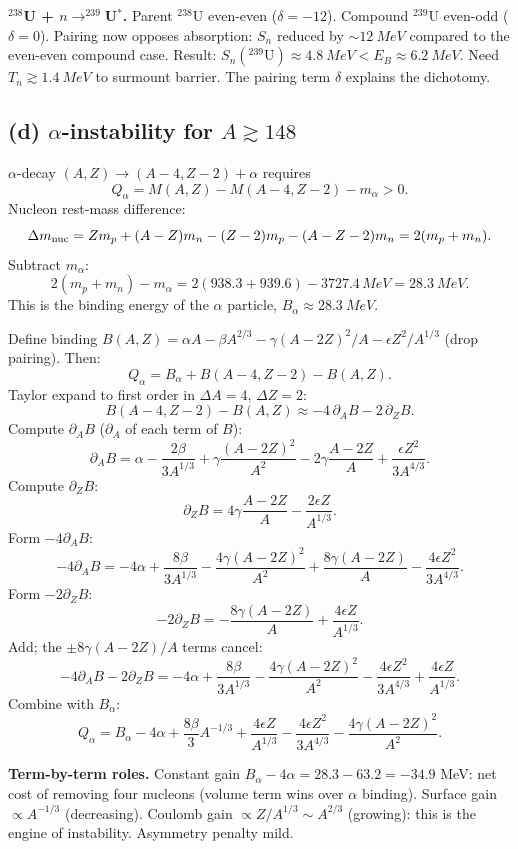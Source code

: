 \documentclass[11pt]{article}
\begin{document}
\textbf{$^{238}$U + $n\to ^{239}$U$^{*}$.} Parent $^{238}$U even-even ($\delta=-12$). Compound $^{239}$U even-odd ($\delta=0$). Pairing now opposes absorption: $S_n$ reduced by $\sim\SI{12}{MeV}$ compared to the even-even compound case. Result: $S_n(^{239}\mathrm{U})\approx \SI{4.8}{MeV}<E_B\approx \SI{6.2}{MeV}$. Need $T_n\gtrsim \SI{1.4}{MeV}$ to surmount barrier. The pairing term $\delta$ explains the dichotomy.

\subsection*{(d) $\alpha$-instability for $A\gtrsim 148$}

$\alpha$-decay $(A,Z)\to(A-4,Z-2)+\alpha$ requires
\[
Q_\alpha=M(A,Z)-M(A-4,Z-2)-m_\alpha>0.
\]
Nucleon rest-mass difference:
\[
\Delta m_{\rm nuc}=Zm_p+(A-Z)m_n-(Z-2)m_p-(A-Z-2)m_n=2(m_p+m_n).
\]
Subtract $m_\alpha$:
\[
2(m_p+m_n)-m_\alpha=2(938.3+939.6)-3727.4\,\si{MeV}=\SI{28.3}{MeV}.
\]
This is the binding energy of the $\alpha$ particle, $B_\alpha\approx\SI{28.3}{MeV}$.

Define binding $B(A,Z)=\alpha A-\beta A^{2/3}-\gamma(A-2Z)^{2}/A-\epsilon Z^{2}/A^{1/3}$ (drop pairing). Then:
\[
Q_\alpha=B_\alpha+B(A-4,Z-2)-B(A,Z).
\]
Taylor expand to first order in $\Delta A=4$, $\Delta Z=2$:
\[
B(A-4,Z-2)-B(A,Z)\approx -4\,\partial_A B-2\,\partial_Z B.
\]
Compute $\partial_A B$ ($\partial_A$ of each term of $B$):
\[
\partial_A B=\alpha-\frac{2\beta}{3A^{1/3}}+\gamma\frac{(A-2Z)^{2}}{A^{2}}-2\gamma\frac{A-2Z}{A}+\frac{\epsilon Z^{2}}{3A^{4/3}}.
\]
Compute $\partial_Z B$:
\[
\partial_Z B=4\gamma\frac{A-2Z}{A}-\frac{2\epsilon Z}{A^{1/3}}.
\]
Form $-4\partial_A B$:
\[
-4\partial_A B=-4\alpha+\frac{8\beta}{3A^{1/3}}-\frac{4\gamma(A-2Z)^{2}}{A^{2}}+\frac{8\gamma(A-2Z)}{A}-\frac{4\epsilon Z^{2}}{3A^{4/3}}.
\]
Form $-2\partial_Z B$:
\[
-2\partial_Z B=-\frac{8\gamma(A-2Z)}{A}+\frac{4\epsilon Z}{A^{1/3}}.
\]
Add; the $\pm 8\gamma(A-2Z)/A$ terms cancel:
\[
-4\partial_A B-2\partial_Z B=-4\alpha+\frac{8\beta}{3A^{1/3}}-\frac{4\gamma(A-2Z)^{2}}{A^{2}}-\frac{4\epsilon Z^{2}}{3A^{4/3}}+\frac{4\epsilon Z}{A^{1/3}}.
\]
Combine with $B_\alpha$:
\begin{equation}
Q_\alpha=B_\alpha-4\alpha+\frac{8\beta}{3}A^{-1/3}+\frac{4\epsilon Z}{A^{1/3}}-\frac{4\epsilon Z^{2}}{3A^{4/3}}-\frac{4\gamma(A-2Z)^{2}}{A^{2}}.
\label{eq:Qalpha}
\end{equation}

\textbf{Term-by-term roles.} Constant gain $B_\alpha-4\alpha=28.3-63.2=-34.9$ MeV: net cost of removing four nucleons (volume term wins over $\alpha$ binding). Surface gain $\propto A^{-1/3}$ (decreasing). Coulomb gain $\propto Z/A^{1/3}\sim A^{2/3}$ (growing): this is the engine of instability. Asymmetry penalty mild.
\end{document}
